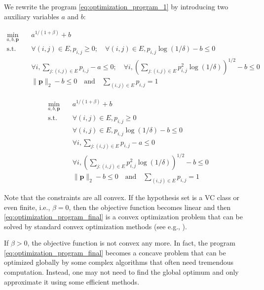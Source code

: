 \documentclass[letterpaper]{article} %
\def\DoubleColumn{}
\def\DoubleColumnEnd{}
\def\SingleColumn{}
\def\SingleColumnEnd{}
\newcommand{\probdistri}{\mathbf{p}}
\newcommand{\pair}[1]{(#1)}
\newcommand{\complexbound}{\beta}
\begin{document}
We rewrite the program \eqref{eq:optimization_program_1} by introducing two auxiliary variables $a$ and $b$: 
\SingleColumn
\begin{equation}
    \label{eq:optimization_program_final}
\begin{aligned}
    \min_{a,b,\probdistri{}} \quad&
    a^{1/(1+\complexbound{})}+b\\
    \mbox{s.t.} \quad &\forall \pair{i,j}\in E, p_{i,j}\ge 0; \quad \forall \pair{i,j}\in E, p_{i,j}\log(1/\delta) - b \le 0\\
    & \forall i, \sum_{j:\pair{i,j}\in E} p_{i,j} -a  \le 0; \quad \forall i, \left(\sum_{j:\pair{i,j}\in E} p^2_{i,j}\log(1/\delta)\right)^{1/2} -b  \le 0\\
    & \|\probdistri{}\|_2 -b \le 0 \quad \mbox{and} \quad \sum_{\pair{i,j}\in E} p_{i,j}= 1
\end{aligned}
\end{equation}
\SingleColumnEnd
\DoubleColumn
\begin{equation}
    \label{eq:optimization_program_final}
\begin{aligned}
    \min_{a,b,\probdistri{}} \quad&
    a^{1/(1+\complexbound{})}+b\\
    \mbox{s.t.} \quad &\forall \pair{i,j}\in E, p_{i,j}\ge 0 \\
    & \forall \pair{i,j}\in E, p_{i,j}\log(1/\delta) - b \le 0\\
    & \forall i, \sum_{j:\pair{i,j}\in E} p_{i,j} -a  \le 0\\
    & \forall i, \left(\sum_{j:\pair{i,j}\in E} p^2_{i,j}\log(1/\delta)\right)^{1/2} -b  \le 0\\
    & \|\probdistri{}\|_2 -b \le 0 \quad \mbox{and} \quad \sum_{\pair{i,j}\in E} p_{i,j}= 1
\end{aligned}
\end{equation}
\DoubleColumnEnd
Note that the constraints are all convex. 
If the hypothesis set is a VC class or even finite, i.e., $\complexbound{}=0$, then the objective function becomes linear and then \eqref{eq:optimization_program_final} is a convex optimization problem that can be solved by standard convex optimization methods (see e.g., \cite{boyd2004convex}).

If $\complexbound{}>0$, the objective function is not convex any more. In fact, the program \eqref{eq:optimization_program_final} becomes a concave problem that can be optimized globally by some complex algorithms \cite{benson1995concave,hoffman1981method} that often need tremendous computation. Instead, one may not need to find the global optimum and only approximate it using some efficient methods. 
\end{document}
